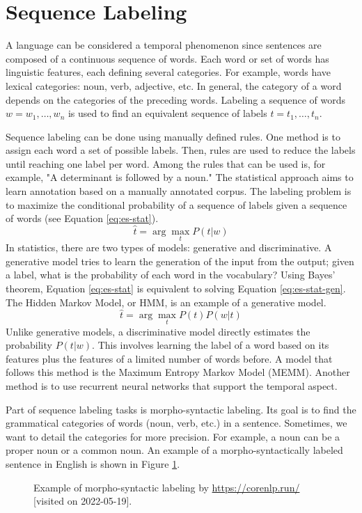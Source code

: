 \documentclass{KBook}
\begin{document}
\section{Sequence Labeling}

A language can be considered a temporal phenomenon since sentences are composed of a continuous sequence of words.
Each word or set of words has linguistic features, each defining several categories.
For example, words have lexical categories: noun, verb, adjective, etc.
In general, the category of a word depends on the categories of the preceding words.
Labeling a sequence of words $w = w_1, \ldots, w_n$ is used to find an equivalent sequence of labels $t = t_1, \ldots, t_n$.

Sequence labeling can be done using manually defined rules.
One method is to assign each word a set of possible labels.
Then, rules are used to reduce the labels until reaching one label per word.
Among the rules that can be used is, for example, "A determinant is followed by a noun."
The statistical approach aims to learn annotation based on a manually annotated corpus.
The labeling problem is to maximize the conditional probability of a sequence of labels given a sequence of words (see Equation \ref{eq:es-stat}).
\begin{equation}\label{eq:es-stat}
	\hat{t} = \arg\max\limits_t P(t | w)
\end{equation}
In statistics, there are two types of models: generative and discriminative.
A generative model tries to learn the generation of the input from the output; given a label, what is the probability of each word in the vocabulary?
Using Bayes' theorem, Equation \ref{eq:es-stat} is equivalent to solving Equation \ref{eq:es-stat-gen}.
The Hidden Markov Model, or HMM, is an example of a generative model.
\begin{equation}\label{eq:es-stat-gen}
	\hat{t} = \arg\max\limits_t P(t) P(w | t) 
\end{equation}
Unlike generative models, a discriminative model directly estimates the probability $P(t | w)$.
This involves learning the label of a word based on its features plus the features of a limited number of words before.
A model that follows this method is the Maximum Entropy Markov Model (MEMM).
Another method is to use recurrent neural networks that support the temporal aspect.

Part of sequence labeling tasks is morpho-syntactic labeling.
Its goal is to find the grammatical categories of words (noun, verb, etc.) in a sentence.
Sometimes, we want to detail the categories for more precision.
For example, a noun can be a proper noun or a common noun.
An example of a morpho-syntactically labeled sentence in English is shown in Figure \ref{fig:ems-exp}.
\begin{figure}[ht]
	\centering
	\caption[Example of morpho-syntactic labeling.]{Example of morpho-syntactic labeling by \url{https://corenlp.run/} [visited on 2022-05-19].}
	\label{fig:ems-exp}
\end{figure}
\end{document}
